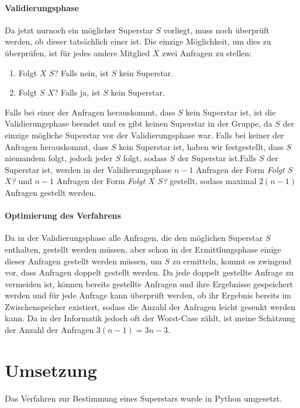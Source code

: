 \documentclass[a4paper,10pt,ngerman]{scrartcl}
\begin{document}
\paragraph{Validierungsphase}
Da jetzt nurnoch ein möglicher Superstar $S$ vorliegt, muss noch überprüft werden, ob dieser tatsächlich einer ist. Die einzige Möglichkeit, um dies zu überprüfen, ist für jedes andere Mitglied $X$ zwei Anfragen zu stellen:
\begin{enumerate}
\item Folgt $X$ $S$? Falls nein, ist $S$ kein Superstar.
\item Folgt $S$ $X$? Falls ja, ist $S$ kein Superstar.
\end{enumerate}
Falls bei einer der Anfragen herauskommt, dass $S$ kein Superstar ist, ist die Validierungsphase beendet und es gibt keinen Superstar in der Gruppe, da $S$ der einzige mögliche Superstar vor der Validierungsphase war.\newline
Falls bei keiner der Anfragen herauskommt, dass $S$ kein Superstar ist, haben wir festgestellt, dass $S$ niemandem folgt, jedoch jeder $S$ folgt, sodass $S$ der Superstar ist.\newline Falls $S$ der Superstar ist, werden in der Validierungsphase $n-1$ Anfragen der Form \textit{Folgt $S$ $X$?} und $n-1$ Anfragen der Form \textit{Folgt $X$ $S$?} gestellt, sodass maximal $2(n-1)$ Anfragen gestellt werden.

\paragraph{Optimierung des Verfahrens}
Da in der Validierungsphase alle Anfragen, die den möglichen Superstar $S$ enthalten, gestellt werden müssen, aber schon in der Ermittlungsphase einige dieser Anfragen gestellt werden müssen, um $S$ zu ermitteln, kommt es zwingend vor, dass Anfragen doppelt gestellt werden. Da jede doppelt gestellte Anfrage zu vermeiden ist, können bereits gestellte Anfragen und ihre Ergebnisse gespeichert werden und für jede Anfrage kann überprüft werden, ob ihr Ergebnis bereits im Zwischenspeicher existiert, sodass die Anzahl der Anfragen leicht gesenkt werden kann. Da in der Informatik jedoch oft der Worst-Case zählt, ist meine Schätzung der Anzahl der Anfragen $3(n-1) = 3n-3$.

\clearpage


\section{Umsetzung}
Das Verfahren zur Bestimmung eines Superstars wurde in Python umgesetzt.
\end{document}
